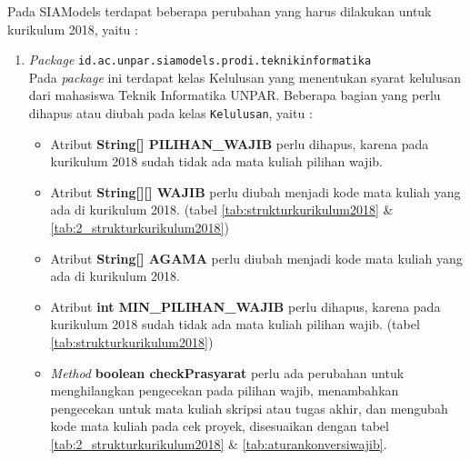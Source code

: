 Pada SIAModels terdapat beberapa perubahan yang harus dilakukan untuk kurikulum 2018, yaitu :
\begin{enumerate}
	\item \textit{Package} \texttt{id.ac.unpar.siamodels.prodi.teknikinformatika}\\
	Pada \textit{package} ini terdapat kelas Kelulusan yang menentukan syarat kelulusan dari mahasiswa Teknik Informatika UNPAR. Beberapa bagian yang perlu dihapus atau diubah pada kelas \texttt{Kelulusan}, yaitu :
	\begin{itemize}
		\item Atribut \textbf{String[] PILIHAN\_WAJIB} perlu dihapus, karena pada kurikulum 2018 sudah tidak ada mata kuliah pilihan wajib.
		\item Atribut \textbf{String[][] WAJIB} perlu diubah menjadi kode mata kuliah yang ada di kurikulum 2018. (tabel \ref{tab:strukturkurikulum2018} \& \ref{tab:2_strukturkurikulum2018})
		\item Atribut \textbf{String[] AGAMA} perlu diubah menjadi kode mata kuliah yang ada di kurikulum 2018.
		\item Atribut \textbf{int MIN\_PILIHAN\_WAJIB} perlu dihapus, karena pada kurikulum 2018 sudah tidak ada mata kuliah pilihan wajib. (tabel \ref{tab:strukturkurikulum2018})
		\item \textit{Method} \textbf{boolean checkPrasyarat} perlu ada perubahan untuk menghilangkan pengecekan pada pilihan wajib, menambahkan pengecekan untuk mata kuliah skripsi atau tugas akhir, dan mengubah kode mata kuliah pada cek proyek, disesuaikan dengan tabel \ref{tab:2_strukturkurikulum2018} \& \ref{tab:aturankonversiwajib}.
	\end{itemize}
		

\end{enumerate}
